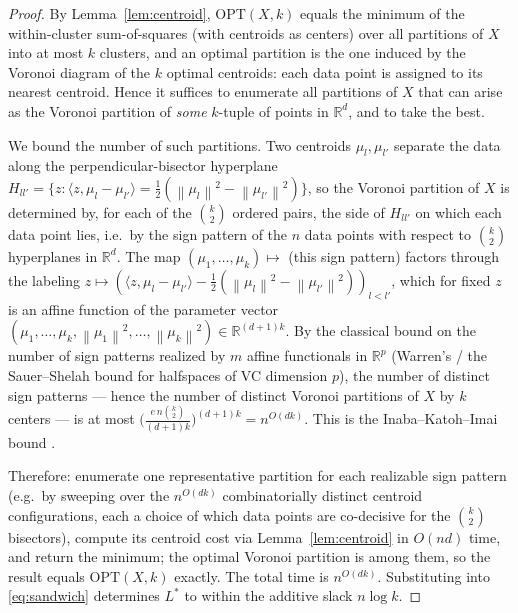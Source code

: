 \documentclass{amsart}
\theoremstyle{plain}
\theoremstyle{definition}
\newcommand{\R}{\mathbb{R}}
\newcommand{\norm}[1]{\left\lVert #1 \right\rVert}
\begin{document}
\begin{proof}
By Lemma~\ref{lem:centroid}, $\mathrm{OPT}(X,k)$ equals the minimum of the
within-cluster sum-of-squares (with centroids as centers) over all partitions of
$X$ into at most $k$ clusters, and an optimal partition is the one induced by the
Voronoi diagram of the $k$ optimal centroids: each data point is assigned to its
nearest centroid. Hence it suffices to enumerate all partitions of $X$ that can
arise as the Voronoi partition of \emph{some} $k$-tuple of points in $\R^{d}$, and
to take the best.

We bound the number of such partitions. Two centroids $\mu_{l},\mu_{l'}$ separate
the data along the perpendicular-bisector hyperplane
$H_{ll'}=\{z:\langle z,\mu_{l}-\mu_{l'}\rangle=\tfrac12(\norm{\mu_{l}}^{2}-\norm{\mu_{l'}}^{2})\}$,
so the Voronoi partition of $X$ is determined by, for each of the $\binom{k}{2}$
ordered pairs, the side of $H_{ll'}$ on which each data point lies, i.e.\ by the
sign pattern of the $n$ data points with respect to $\binom{k}{2}$ hyperplanes in
$\R^{d}$. The map $(\mu_{1},\dots,\mu_{k})\mapsto$ (this sign pattern) factors
through the labeling $z\mapsto(\langle z,\mu_{l}-\mu_{l'}\rangle-\tfrac12(\norm{\mu_l}^2-\norm{\mu_{l'}}^2))_{l<l'}$,
which for fixed $z$ is an affine function of the parameter vector
$(\mu_{1},\dots,\mu_{k},\norm{\mu_1}^2,\dots,\norm{\mu_k}^2)\in\R^{(d+1)k}$. By the
classical bound on the number of sign patterns realized by $m$ affine functionals
in $\R^{p}$ (Warren's / the Sauer--Shelah bound for halfspaces of VC dimension
$p$), the number of distinct sign patterns --- hence the number of distinct
Voronoi partitions of $X$ by $k$ centers --- is at most
$\big(\tfrac{e\,n\binom{k}{2}}{(d+1)k}\big)^{(d+1)k}=n^{O(dk)}$. This is the
Inaba--Katoh--Imai bound \cite{IKI}.

Therefore: enumerate one representative partition for each realizable sign pattern
(e.g.\ by sweeping over the $n^{O(dk)}$ combinatorially distinct centroid
configurations, each a choice of which data points are co-decisive for the
$\binom{k}{2}$ bisectors), compute its centroid cost via Lemma~\ref{lem:centroid}
in $O(nd)$ time, and return the minimum; the optimal Voronoi partition is among
them, so the result equals $\mathrm{OPT}(X,k)$ exactly. The total time is
$n^{O(dk)}$. Substituting into \eqref{eq:sandwich} determines $L^{\ast}$ to within
the additive slack $n\log k$.
\end{proof}
\end{document}
